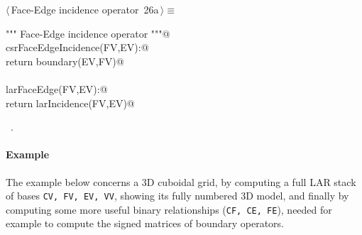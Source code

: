 \documentclass[11pt,oneside]{article}    %
\begin{document}
\begin{flushleft} \small \label{scrap42}
\protect{}$\langle\,$Face-Edge incidence operator\nobreak\ {\footnotesize 26a}$\,\rangle\equiv$
\vspace{-1ex}
\begin{list}{}{} \item
\mbox{}\verb@""" Face-Edge incidence operator """@\\
\mbox{}\verb@def csrFaceEdgeIncidence(FV,EV):@\\
\mbox{}\verb@    return boundary(EV,FV)@\\
\mbox{}\verb@@\\
\mbox{}\verb@def larFaceEdge(FV,EV):@\\
\mbox{}\verb@    return larIncidence(FV,EV)@\\
\mbox{}\verb@@{\NWsep}
\end{list}
\vspace{-1ex}
\footnotesize\addtolength{\baselineskip}{-1ex}
\begin{list}{}{\setlength{\itemsep}{-\parsep}\setlength{\itemindent}{-\leftmargin}}
\item \NWtxtMacroRefIn\ .
\end{list}
\end{flushleft}


\paragraph{Example}
The example below concerns a 3D cuboidal grid, by computing a full LAR stack of bases
\texttt{CV, FV, EV, VV}, showing its fully numbered 3D model, and finally by computing
some more useful binary relationships (\texttt{CF, CE, FE}), needed for example to compute the signed matrices of boundary operators.
\end{document}
